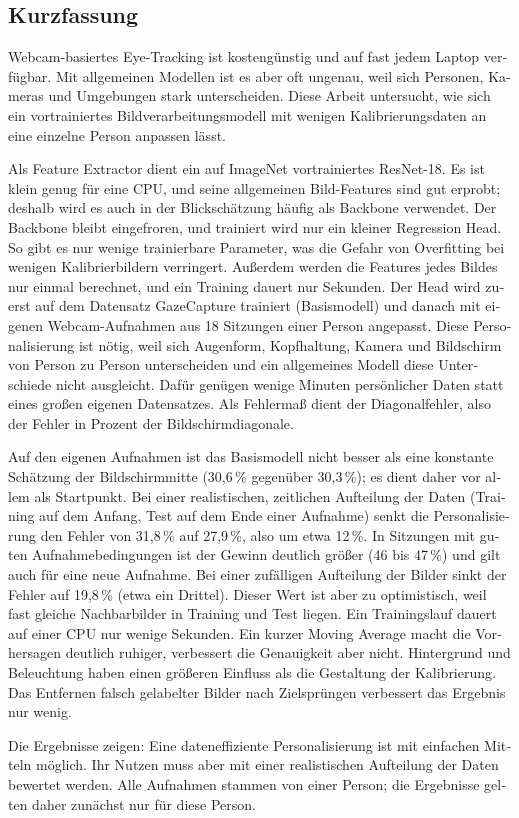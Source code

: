 \begin{otherlanguage}{ngerman}
\chapter*{Kurzfassung}
Webcam-basiertes Eye-Tracking ist kostengünstig und auf fast jedem Laptop
verfügbar. Mit allgemeinen Modellen ist es aber oft ungenau, weil sich Personen,
Kameras und Umgebungen stark unterscheiden. Diese Arbeit untersucht, wie sich
ein vortrainiertes Bildverarbeitungsmodell mit wenigen Kalibrierungsdaten an
eine einzelne Person anpassen lässt.

Als Feature Extractor dient ein auf ImageNet vortrainiertes ResNet-18. Es ist
klein genug für eine CPU, und seine allgemeinen Bild-Features sind gut erprobt;
deshalb wird es auch in der Blickschätzung häufig als Backbone verwendet. Der
Backbone bleibt eingefroren, und trainiert wird nur ein kleiner Regression
Head. So gibt es nur wenige trainierbare Parameter, was die Gefahr von
Overfitting bei wenigen Kalibrierbildern verringert. Außerdem werden die
Features jedes Bildes nur einmal berechnet, und ein Training dauert nur
Sekunden. Der Head wird zuerst auf dem Datensatz GazeCapture trainiert
(Basismodell) und danach mit eigenen Webcam-Aufnahmen aus 18 Sitzungen einer
Person angepasst. Diese Personalisierung ist nötig, weil sich Augenform,
Kopfhaltung, Kamera und Bildschirm von Person zu Person unterscheiden und ein
allgemeines Modell diese Unterschiede nicht ausgleicht. Dafür genügen wenige
Minuten persönlicher Daten statt eines großen eigenen Datensatzes. Als
Fehlermaß dient der Diagonalfehler, also der Fehler in Prozent der
Bildschirmdiagonale.

Auf den eigenen Aufnahmen ist das Basismodell nicht besser als eine konstante
Schätzung der Bildschirmmitte (30,6\,\% gegenüber 30,3\,\%); es dient daher
vor allem als Startpunkt. Bei einer realistischen, zeitlichen Aufteilung der
Daten (Training auf dem Anfang, Test auf dem Ende einer Aufnahme) senkt die
Personalisierung den Fehler von 31,8\,\% auf 27,9\,\%, also um etwa 12\,\%.
In Sitzungen mit guten Aufnahmebedingungen ist der Gewinn deutlich größer (46
bis 47\,\%) und gilt auch für eine neue Aufnahme. Bei einer zufälligen
Aufteilung der Bilder sinkt der Fehler auf 19,8\,\% (etwa ein Drittel). Dieser
Wert ist aber zu optimistisch, weil fast gleiche Nachbarbilder in Training und
Test liegen. Ein Trainingslauf dauert auf einer CPU nur wenige Sekunden. Ein kurzer Moving
Average macht die Vorhersagen deutlich ruhiger, verbessert die Genauigkeit aber
nicht. Hintergrund und Beleuchtung haben einen größeren Einfluss als die
Gestaltung der Kalibrierung. Das Entfernen falsch gelabelter Bilder nach
Zielsprüngen verbessert das Ergebnis nur wenig.

Die Ergebnisse zeigen: Eine dateneffiziente Personalisierung ist mit einfachen
Mitteln möglich. Ihr Nutzen muss aber mit einer realistischen Aufteilung der
Daten bewertet werden. Alle Aufnahmen stammen von einer Person; die Ergebnisse
gelten daher zunächst nur für diese Person.

\end{otherlanguage}
